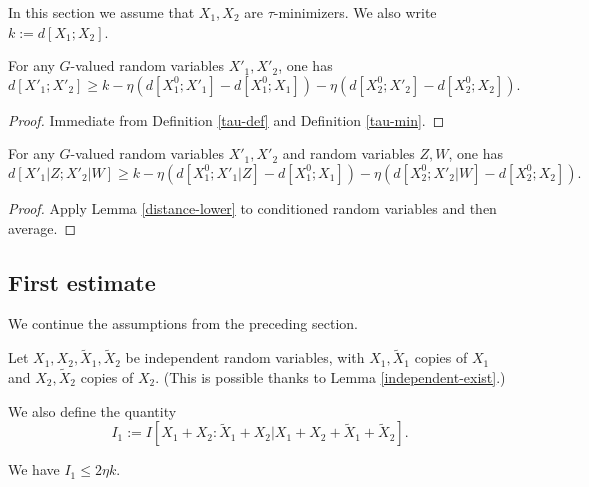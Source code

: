 In this section we assume that $X_1,X_2$ are $\tau$-minimizers. We also write $k := d[X_1;X_2]$.

\begin{lemma}\label{distance-lower}
  \leanok
  For any $G$-valued random variables $X'_1,X'_2$, one has
$$ d[X'_1;X'_2] \geq k - \eta (d[X^0_1;X'_1] - d[X^0_1;X_1] ) - \eta (d[X^0_2;X'_2] - d[X^0_2;X_2] ).$$
\end{lemma}

\begin{proof}
  \leanok
  Immediate from Definition \ref{tau-def} and Definition \ref{tau-min}.
\end{proof}

\begin{lemma}\label{cond-distance-lower}
  \leanok
  For any $G$-valued random variables $X'_1,X'_2$ and random variables $Z,W$, one has
$$ d[X'_1|Z;X'_2|W] \geq k - \eta (d[X^0_1;X'_1|Z] - d[X^0_1;X_1] ) - \eta (d[X^0_2;X'_2|W] - d[X^0_2;X_2] ).$$
\end{lemma}

\begin{proof}  Apply Lemma \ref{distance-lower} to conditioned random variables and then average.
\end{proof}

\subsection{First estimate}

We continue the assumptions from the preceding section.

Let $X_1, X_2, \tilde X_1, \tilde X_2$ be independent random variables, with $X_1,\tilde X_1$ copies of $X_1$ and $X_2,\tilde X_2$ copies of $X_2$.  (This is possible thanks to Lemma \ref{independent-exist}.)

We also define the quantity
$$ I_1 :=  I [ X_1+X_2 : \tilde X_1 + X_2 | X_1+X_2+\tilde X_1+\tilde X_2 ].$$


\begin{lemma}\label{first-estimate}
  \leanok We have $I_1 \leq 2 \eta k$.
\end{lemma}


